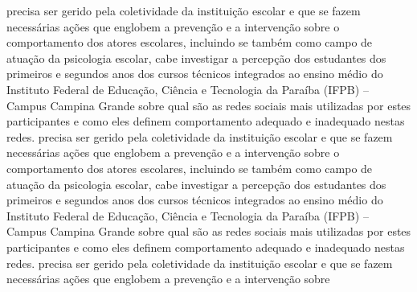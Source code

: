 precisa ser gerido pela coletividade da instituição escolar e que se fazem necessárias ações que englobem a prevenção e a intervenção sobre o comportamento dos atores escolares, incluindo se também como campo de atuação da psicologia escolar, cabe investigar a percepção dos estudantes dos primeiros e segundos anos dos cursos técnicos integrados ao ensino médio do Instituto Federal de Educação, Ciência e Tecnologia da Paraíba (IFPB) – Campus Campina Grande  sobre qual são as redes sociais mais utilizadas por estes participantes e como  eles definem comportamento adequado e inadequado nestas redes.
precisa ser gerido pela coletividade da instituição escolar e que se fazem necessárias ações que englobem a prevenção e a intervenção sobre o comportamento dos atores escolares, incluindo se também como campo de atuação da psicologia escolar, cabe investigar a percepção dos estudantes dos primeiros e segundos anos dos cursos técnicos integrados ao ensino médio do Instituto Federal de Educação, Ciência e Tecnologia da Paraíba (IFPB) – Campus Campina Grande sobre qual são as redes sociais mais utilizadas por estes participantes e como eles definem comportamento adequado e inadequado nestas redes.
precisa ser gerido pela coletividade da instituição escolar e que se fazem necessárias ações que englobem a prevenção e a intervenção sobre 